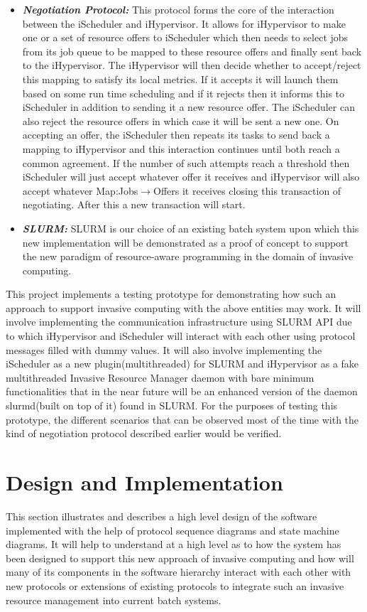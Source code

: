 \documentclass[a4paper, 12pt]{article}
\begin{document}
\begin{itemize}
\item \textbf{\textit{Negotiation Protocol:}} This protocol forms the core of the interaction between the iScheduler and iHypervisor. It allows for iHypervisor to make one or a set of resource offers to iScheduler which then needs to select jobs from its job queue to be mapped to these resource offers and finally sent back to the iHypervisor. The iHypervisor will then decide whether to accept/reject this mapping to satisfy its local metrics. If it accepts it will launch them based on some run time scheduling and if it rejects then it informs this to iScheduler in addition to sending it a new resource offer. The iScheduler can also reject the resource offers in which case it will be sent a new one. On accepting an offer, the iScheduler then repeats its tasks to send back a mapping to iHypervisor and this interaction continues until both reach a common agreement. If the number of such attempts reach a threshold then iScheduler will just accept whatever offer it receives and iHypervisor will also accept whatever Map:Jobs$\rightarrow$Offers it receives closing this transaction of negotiating. After this a new transaction will start.
\item \textbf{\textit{SLURM:}} SLURM is our choice of an existing batch system upon which this new implementation will be demonstrated as a proof of concept to support the new paradigm of resource-aware programming in the domain of invasive computing.
\end{itemize}
\noindent
This project implements a testing prototype for demonstrating how such an approach to support invasive computing with the above entities may work. It will involve implementing the communication infrastructure using SLURM API due to which iHypervisor and iScheduler will interact with each other using protocol messages filled with dummy values. It will also involve implementing the iScheduler as a new plugin(multithreaded) for SLURM and iHypervisor as a fake multithreaded Invasive Resource Manager daemon with bare minimum functionalities that in the near future will be an enhanced version of the daemon slurmd(built on top of it) found in SLURM. For the purposes of testing this prototype, the different scenarios that can be observed most of the time with the kind of negotiation protocol described earlier would be verified.
\clearpage
\section{Design and Implementation}
This section illustrates and describes a high level design of the software implemented with the help of protocol sequence diagrams and state machine diagrams. It will help to understand at a high level as to how the system has been designed to support this new approach of invasive computing and how will many of its components in the software hierarchy interact with each other with new protocols or extensions of existing protocols to integrate such an invasive resource management into current batch systems.
\end{document}
